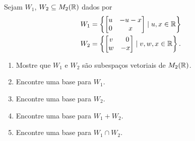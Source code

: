 \documentclass[12pt]{exam}
\begin{document}
    \begin{exercicio}
        Sejam $W_1$, $W_2 \subseteq M_2(\mathbb{R})$ dados por
        \begin{align*}
            W_1 &= \left\{
                        \begin{bmatrix}
                            u & -u -x\\
                            0 & x
                        \end{bmatrix}
                        \mid u, x \in \mathbb{R}
                    \right\}\\
            W_2 &= \left\{
                        \begin{bmatrix}
                            v & \phantom{x} 0\\
                            w & -x
                        \end{bmatrix}
                        \mid v, w, x \in \mathbb{R}
                    \right\}.
        \end{align*}
        
        \begin{enumerate}[label={\alph*})]
        
            \item Mostre que $W_1$ e $W_2$ s\~ao subespa\c{c}os vetoriais de $M_2(\mathbb{R})$.
                
            \item Encontre uma base para $W_1$.
            
            \item Encontre uma base para $W_2$.
            
            \item Encontre uma base para $W_1 + W_2$.
            
            \item Encontre uma base para $W_1 \cap W_2$.
        \end{enumerate}
    \end{exercicio}
\end{document}
